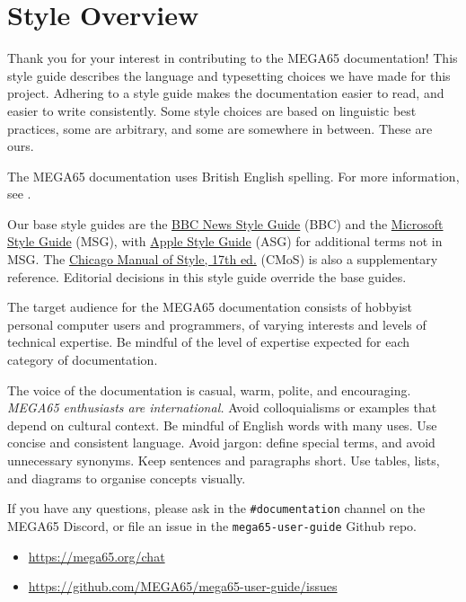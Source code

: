 



\chapter{Style Overview}

Thank you for your interest in contributing to the MEGA65 documentation! This style guide describes the language and typesetting choices we have made for this project. Adhering to a style guide makes the documentation easier to read, and easier to write consistently. Some style choices are based on linguistic best practices, some are arbitrary, and some are somewhere in between. These are ours.

The MEGA65 documentation uses British English spelling. For more information, see .

Our base style guides are the \href{https://www.bbc.co.uk/newsstyleguide/}{BBC News Style Guide} (BBC) and the \href{https://docs.microsoft.com/en-us/style-guide/welcome/}{Microsoft Style Guide} (MSG), with \href{https://support.apple.com/en-my/guide/applestyleguide/welcome/web}{Apple Style Guide} (ASG) for additional terms not in MSG. The \href{https://www.chicagomanualofstyle.org/home.html}{Chicago Manual of Style, 17th ed.} (CMoS) is also a supplementary reference. Editorial decisions in this style guide override the base guides.

The target audience for the MEGA65 documentation consists of hobbyist personal computer users and programmers, of varying interests and levels of technical expertise. Be mindful of the level of expertise expected for each category of documentation.

The voice of the documentation is casual, warm, polite, and encouraging. \emph{MEGA65 enthusiasts are international.} Avoid colloquialisms or examples that depend on cultural context. Be mindful of English words with many uses. Use concise and consistent language. Avoid jargon: define special terms, and avoid unnecessary synonyms. Keep sentences and paragraphs short. Use tables, lists, and diagrams to organise concepts visually.

If you have any questions, please ask in the {\tt \#documentation} channel on the MEGA65 Discord, or file an issue in the {\tt mega65-user-guide} Github repo.

\begin{itemize}
\item \url{https://mega65.org/chat}
\item \url{https://github.com/MEGA65/mega65-user-guide/issues}
\end{itemize}

